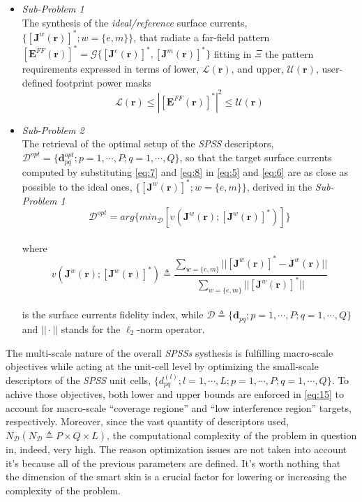 \begin{itemize}
\item \emph{Sub-Problem 1}\\
The synthesis of the \emph{ideal/reference} surface currents, $\{[\mathbf{J}^{w}(\mathbf{r})]^{*};w=\{ e,m\}\}$,
that radiate a far-field pattern $[\mathbf{E}^{FF}(\mathbf{r})]^{*}=\mathcal{G}\{[\mathbf{J}^{e}(\mathbf{r})]^{*},[\mathbf{J}^{m}(\mathbf{r})]^{*}\}$
fitting in $\Xi$ the pattern requirements expressed in terms of lower,
$\mathcal{L}(\mathbf{r})$, and upper, $\mathcal{U}(\mathbf{r})$,
user-defined footprint power masks \begin{equation}
\mathcal{L}(\mathbf{r})\leq|[\mathbf{E}^{FF}(\mathbf{r})]^{*}|^{2}\leq\mathcal{U}(\mathbf{r})\label{eq:15}\end{equation}

\item \emph{Sub-Problem 2}\\
The retrieval of the optimal setup of the \emph{SPSS} descriptors,
$\mathcal{D}^{opt}=\{\mathbf{d}_{pq}^{opt};p=1,\cdots,P;q=1,\cdots,Q\}$,
so that the target surface currents computed by substituting \ref{eq:7}
and \ref{eq:8} in \ref{eq:5} and \ref{eq:6} are as close as possible
to the ideal ones, $\{[\mathbf{J}^{w}(\mathbf{r})]^{*};w=\{ e,m\}\}$,
derived in the \emph{Sub-Problem 1}\begin{equation}
\mathcal{D}^{opt}=arg\{ min_{\mathcal{D}}[v(\mathbf{J}^{w}(\mathbf{r});[\mathbf{J}^{w}(\mathbf{r})]^{*})]\}\label{eq:16}\end{equation}
\\
where\begin{equation}
v(\mathbf{J}^{w}(\mathbf{r});[\mathbf{J}^{w}(\mathbf{r})]^{*})\triangleq\frac{\sum_{w=\{ e,m\}}||[\mathbf{J}^{w}(\mathbf{r})]^{*}-\mathbf{J}^{w}(\mathbf{r})||}{\sum_{w=\{ e,m\}}||[\mathbf{J}^{w}(\mathbf{r})]^{*}||}\label{eq:17}\end{equation}
\\
is the surface currents fidelity index, while $\mathcal{D}\triangleq\{\mathbf{d}_{pq};p=1,\cdots,P;q=1,\cdots,Q\}$
and $||\cdot||$ stands for the $\ell_{2}$-norm operator.
\end{itemize}
The multi-scale nature of the overall \emph{SPSSs} systhesis is fulfilling
macro-scale objectives while acting at the unit-cell level by optimizing
the small-scale descriptors of the \emph{SPSS} unit cells, $\{ d_{pq}^{(l)};l=1,\cdots,L;p=1,\cdots,P;q=1,\cdots,Q\}$.
To achive those objectives, both lower and upper bounds are enforced
in \ref{eq:15} to account for macro-scale {}``coverage regione''
and {}``low interference region'' targets, respectively. Moreover,
since the vast quantity of descriptors used, $N_{\mathcal{D}}(N_{\mathcal{D}}\triangleq P\times Q\times L)$,
the computational complexity of the problem in question in, indeed,
very high. The reason optimization issues are not taken into account
it's because all of the previous parameters are defined. It's worth
nothing that the dimension of the smart skin is a crucial factor for
lowering or increasing the complexity of the problem. \emph{}


